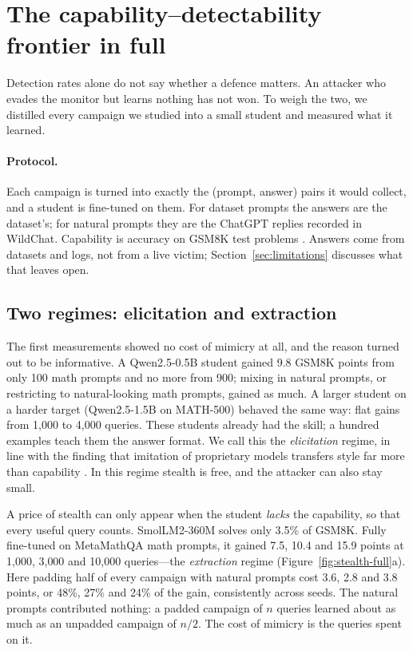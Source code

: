 \section{The capability--detectability frontier in full}
\label{sec:frontier-full}

Detection rates alone do not say whether a defence matters. An attacker who evades the monitor but learns nothing has not won. To weigh the two, we distilled every campaign we studied into a small student and measured what it learned.

\paragraph{Protocol.} Each campaign is turned into exactly the (prompt, answer) pairs it would collect, and a student is fine-tuned on them. For dataset prompts the answers are the dataset's; for natural prompts they are the ChatGPT replies recorded in WildChat. Capability is accuracy on GSM8K test problems \citep{cobbe2021gsm8k}. Answers come from datasets and logs, not from a live victim; Section~\ref{sec:limitations} discusses what that leaves open.

\subsection{Two regimes: elicitation and extraction}

The first measurements showed no cost of mimicry at all, and the reason turned out to be informative. A Qwen2.5-0.5B student \citep{qwen2024qwen25} gained 9.8 GSM8K points from only 100 math prompts and no more from 900; mixing in natural prompts, or restricting to natural-looking math prompts, gained as much. A larger student on a harder target (Qwen2.5-1.5B on MATH-500) behaved the same way: flat gains from 1{,}000 to 4{,}000 queries. These students already had the skill; a hundred examples teach them the answer format. We call this the \emph{elicitation} regime, in line with the finding that imitation of proprietary models transfers style far more than capability \citep{gudibande2024false}. In this regime stealth is free, and the attacker can also stay small.

A price of stealth can only appear when the student \emph{lacks} the capability, so that every useful query counts. SmolLM2-360M \citep{allal2025smollm2} solves only 3.5\% of GSM8K. Fully fine-tuned on MetaMathQA math prompts, it gained 7.5, 10.4 and 15.9 points at 1{,}000, 3{,}000 and 10{,}000 queries---the \emph{extraction} regime (Figure~\ref{fig:stealth-full}a). Here padding half of every campaign with natural prompts cost 3.6, 2.8 and 3.8 points, or 48\%, 27\% and 24\% of the gain, consistently across seeds. The natural prompts contributed nothing: a padded campaign of $n$ queries learned about as much as an unpadded campaign of $n/2$. The cost of mimicry is the queries spent on it.

